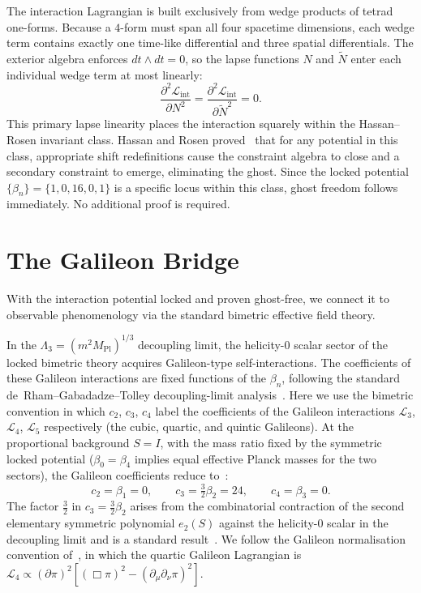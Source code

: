 \documentclass[a4paper,11pt]{article}
\begin{document}
The interaction Lagrangian is built exclusively from
wedge products of tetrad one-forms. Because a $4$-form
must span all four spacetime dimensions, each wedge term
contains exactly one time-like differential and three
spatial differentials. The exterior algebra enforces
$dt \wedge dt = 0$, so the lapse functions $N$ and
$\tilde{N}$ enter each individual wedge term at most
linearly:
\begin{equation}
  \frac{\partial^2\mathcal{L}_{\mathrm{int}}}{\partial N^2}
  = \frac{\partial^2\mathcal{L}_{\mathrm{int}}}
  {\partial \tilde{N}^2} = 0.
\end{equation}
This primary lapse linearity places the interaction
squarely within the Hassan--Rosen invariant class.
Hassan and Rosen proved~\cite{HR2012a,HR2012b,HR2018} that
for any potential in this class, appropriate shift
redefinitions cause the constraint algebra to close and
a secondary constraint to emerge, eliminating the ghost.
Since the locked potential $\{\beta_n\} = \{1,0,16,0,1\}$
is a specific locus within this class, ghost freedom
follows immediately. No additional proof is required.

\section{The Galileon Bridge}

With the interaction potential locked and proven ghost-free,
we connect it to observable phenomenology via the standard
bimetric effective field theory.

In the $\Lambda_3 = (m^2 M_\mathrm{Pl})^{1/3}$ decoupling
limit, the helicity-0 scalar sector of the locked bimetric
theory acquires Galileon-type self-interactions. The
coefficients of these Galileon interactions are fixed
functions of the $\beta_n$, following the standard
de~Rham--Gabadadze--Tolley decoupling-limit
analysis~\cite{deRham2010,deRham2011}. Here we use the
bimetric convention in which $c_2$, $c_3$, $c_4$ label the
coefficients of the Galileon interactions $\mathcal{L}_3$,
$\mathcal{L}_4$, $\mathcal{L}_5$ respectively (the cubic,
quartic, and quintic Galileons). At the proportional
background $S = I$, with the mass ratio fixed by the
symmetric locked potential ($\beta_0 = \beta_4$ implies
equal effective Planck masses for the two sectors), the
Galileon coefficients reduce to~\cite{deRham2011}:
\begin{equation}
  c_2 = \beta_1 = 0, \qquad
  c_3 = \tfrac{3}{2}\beta_2 = 24, \qquad
  c_4 = \beta_3 = 0.
\end{equation}
The factor $\tfrac{3}{2}$ in $c_3 = \tfrac{3}{2}\beta_2$
arises from the combinatorial contraction of the second
elementary symmetric polynomial $e_2(S)$ against the
helicity-0 scalar in the decoupling limit and is a
standard result~\cite{deRham2011}. We follow the Galileon
normalisation convention of~\cite{deRham2011}, in which the
quartic Galileon Lagrangian is
$\mathcal{L}_4 \propto (\partial\pi)^2[(\Box\pi)^2
- (\partial_\mu\partial_\nu\pi)^2]$.
\end{document}
